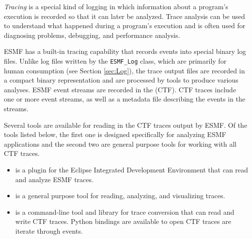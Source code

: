 %

\label{sec:Tracing}

{\em Tracing} is a special kind of logging in which information about
a program's execution is recorded so that it can later be analyzed. Trace
analysis can be used to understand what happened during a program's
execution and is often used for diagnosing problems, debugging, and
performance analysis.

ESMF has a built-in tracing capability that records events into special
binary log files.  Unlike log files written by the {\tt ESMF\_Log} class,
which are primarily for human consumption (see Section \ref{sec:Log}),
the trace output files are
recorded in a compact binary representation and are processed by tools
to produce various analyses. ESMF event streams are recorded in the
 (CTF).
CTF traces include one or more event streams,
as well as a metadata file describing the events in the streams.

Several tools are available for reading in the CTF traces output by ESMF.
Of the tools listed below, the first one is designed specifically for
analyzing ESMF applications and the second two are general purpose tools
for working with all CTF traces.
\begin{itemize}
\item {}
  is a plugin for the Eclipse Integrated Development Environment
  that can read and analyze ESMF traces.
\item {}
  is a general purpose tool for reading, analyzing, and visualizing traces.
\item {}
  is a command-line tool and library for trace conversion
  that can read and write CTF traces. Python bindings are available
  to open CTF traces are iterate through events.  
\end{itemize}

